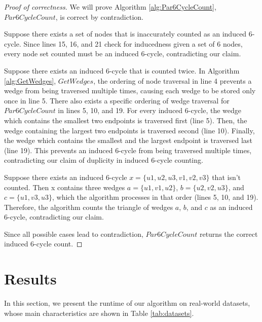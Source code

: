 \documentclass[11pt]{article}
\begin{document}
\begin{proof}[Proof of correctness]
We will prove Algorithm \ref{alg:Par6CycleCount}, $Par6CycleCount$, is correct by contradiction.

Suppose there exists a set of nodes that is inaccurately counted as an induced 6-cycle.
Since lines 15, 16, and 21 check for inducedness given a set of 6 nodes, every node set counted must be an induced 6-cycle, contradicting our claim.

Suppose there exists an induced 6-cycle that is counted twice.
In Algorithm \ref{alg:GetWedges}, $GetWedges$, the ordering of node traversal in line 4 prevents a wedge from being traversed multiple times, causing each wedge to be stored only once in line 5.
There also exists a specific ordering of wedge traversal for $Par6CycleCount$ in lines 5, 10, and 19.
For every induced 6-cycle, the wedge which contains the smallest two endpoints is traversed first (line 5).
Then, the wedge containing the largest two endpoints is traversed second (line 10).
Finally, the wedge which contains the smallest and the largest endpoint is traversed last (line 19).
This prevents an induced 6-cycle from being traversed multiple times, contradicting our claim of duplicity in induced 6-cycle counting.

Suppose there exists an induced 6-cycle $x = \{u1, u2, u3, v1, v2, v3\}$ that isn't counted.
Then x contains three wedges $a = \{u1, v1, u2\}$, $b = \{u2, v2, u3\}$, and $c = \{u1, v3, u3\}$, which the algorithm processes in that order (lines 5, 10, and 19).
Therefore, the algorithm counts the triangle of wedges $a$, $b$, and $c$ as an induced 6-cycle, contradicting our claim.

Since all possible cases lead to contradiction, $Par6CycleCount$ returns the correct induced 6-cycle count.
\end{proof}

\section {Results}

In this section, we present the runtime of our algorithm on real-world datasets, whose main characteristics are shown in Table \ref{tab:datasets}.
\end{document}
